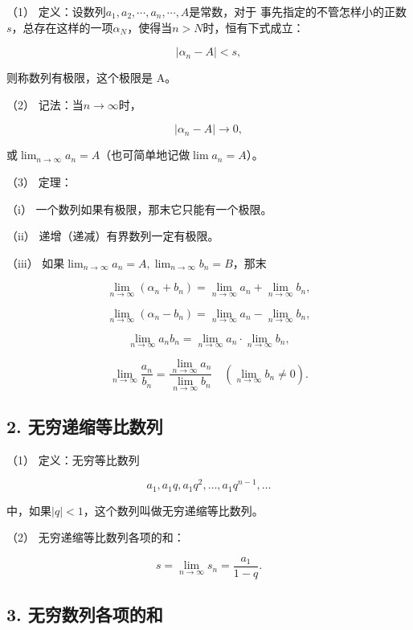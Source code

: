 （1） 定义：设数列\(a_{1}, a_{2}, \cdots, a_{n}, \cdots, A\)是常数，对于
事先指定的不管怎样小的正数\(s\)，总存在这样的一项\(\alpha_{N}\)，使得当\(n > N\)时，恒有下式成立：

\[
\left| \alpha_{n} - A \right| < s,
\]

则称数列有极限，这个极限是 A。

（2） 记法：当\(n \to \infty\)时，

\[
\left| \alpha_{n} - A \right|\rightarrow 0,
\]

或\(\lim_{n\to \infty}a_n = A\)（也可简单地记做\(\lim a_n = A\)）。

（3） 定理：

（i） 一个数列如果有极限，那末它只能有一个极限。

（ii） 递增（递减）有界数列一定有极限。

（iii）
如果\(\lim_{n\to \infty}a_n = A,\lim_{n\to \infty}b_n = B\)，那末

\[
\lim_{n \rightarrow \infty} (\alpha_{n} + b_{n}) = \lim_{n \rightarrow \infty} a_{n} + \lim_{n \rightarrow \infty} b_{n},
\]

\[
\lim_{n \rightarrow \infty} (\alpha_{n} - b_{n}) = \lim_{n \rightarrow \infty} a_{n} - \lim_{n \rightarrow \infty} b_{n},
\]

\[
\lim_{n \rightarrow \infty} a_{n} b_{n} = \lim_{n \rightarrow \infty} a_{n} \cdot \lim_{n \rightarrow \infty} b_{n},
\]

\[
\lim_{n \rightarrow \infty} \frac{a_{n}}{b_{n}} = \frac{\lim_{n \rightarrow \infty} a_{n}}{\lim_{n \rightarrow \infty} b_{n}} \quad (\lim_{n \rightarrow \infty} b_{n} \neq 0).
\]

\subsection{2. 无穷递缩等比数列}

（1） 定义：无穷等比数列

\[
a_{1}, a_{1} q, a_{1} q^{2}, \dots, a_{1} q^{n - 1}, \dots
\]

中，如果\(|q| < 1\)，这个数列叫做无穷递缩等比数列。

（2） 无穷递缩等比数列各项的和：

\[
s = \lim_{n \rightarrow \infty} s_{n} = \frac{a_{1}}{1 - q}.
\]

\subsection{3. 无穷数列各项的和}

